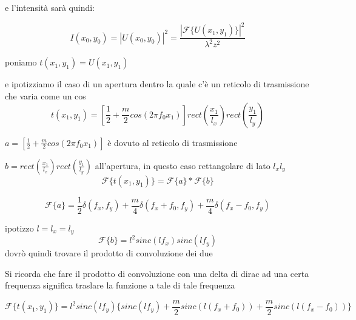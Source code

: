 \documentclass{article}
\begin{document}
e l'intensità sarà quindi:

\begin{equation}
I(x_{0}, y_{0})=|U(x_{0}, y_{0})|^{2}= \frac{|\mathscr{F} \{ U(x_{1},y_{1})\}|^{2}}{\lambda^{2} z^{2}}
\end{equation}




poniamo $t(x_{1}, y_{1}) =U(x_{1}, y_{1})$

e ipotizziamo il caso di un apertura dentro la quale c'è un reticolo di trasmissione che varia come un cos
\begin{equation}
t(x_{1}, y_{1}) = [\frac{1}{2} + \frac{m}{2} cos(2 \pi f_{0} x_{1})] rect(\frac{x_{1}}{l_{x}}) rect(\frac{y_{1}}{l_{y}})
\end{equation}

$a = [\frac{1}{2} + \frac{m}{2} cos(2 \pi f_{0} x_{1})]$ è dovuto al reticolo di trasmissione 

$b = rect(\frac{x_{1}}{l_{x}}) rect(\frac{y_{1}}{l_{y}})$ all'apertura, in questo caso rettangolare di lato $l_{x} l_{y}$ 
\begin{equation}
\mathscr{F} \{ t(x_{1},y_{1})\} = \mathscr{F} \{ a\} * \mathscr{F} \{b\}
\end{equation}


\begin{equation}
\mathscr{F} \{ a\} = \frac{1}{2} \delta(f_{x}, f_{y}) + \frac{m}{4} \delta(f_{x} + f_{0}, f_{y}) + \frac{m}{4} \delta(f_{x} - f_{0}, f_{y})
\end{equation}

ipotizzo $l=l_{x}=l_{y}$
\begin{equation}
\mathscr{F} \{ b\} = l^{2} sinc(l f_{x}) sinc(l f_{y})
\end{equation}
dovrò quindi trovare il prodotto di convoluzione dei due



Si ricorda che fare il prodotto di convoluzione con una delta di dirac ad una certa frequenza significa traslare la funzione a tale di tale frequenza

\begin{equation}
\mathscr{F} \{ t(x_{1},y_{1})\} = l^{2} sinc(l f_{y}) \{		sinc(l f_{y}) +  \frac{m}{2} sinc(l (f_{x} + f_{0}))	+  \frac{m}{2} sinc(l (f_{x} - f_{0}))\}
\end{equation}
\end{document}
